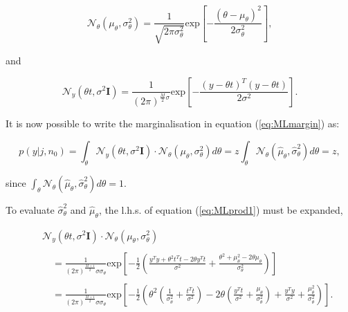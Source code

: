 \begin{equation}\label{eq:MLtheta2}
\mathcal{N}_\theta(\mu_\theta,\sigma^2_\theta) = \frac{1}{\sqrt{2 \pi \sigma_\theta^2}} \textrm{exp}\left[-\frac{\left(\theta - \mu_\theta\right)^2}{2\sigma_\theta^2}\right],
\end{equation}

and

\begin{equation}\label{eq:MLnoise2}
\mathcal{N}_y(\theta t,\sigma^2 \textbf{I}) = \frac{1}{\left(2 \pi\right)^{\frac{M}{2}\sigma}} \textrm{exp}\left[-\frac{\left(y - \theta t\right)^T\left(y - \theta t\right)}{2\sigma^2}\right].
\end{equation}

It is now possible to write the marginalisation in equation (\ref{eq:MLmargin}) as:

\begin{equation}\label{eq:MLmargin2}
p(y|j,n_0)=\int_\theta \mathcal{N}_y(\theta t,\sigma^2 \textbf{I})\cdot\mathcal{N}_\theta(\mu_\theta,\sigma^2_\theta) d\theta = z \int_\theta \mathcal{N}_\theta(\hat{\mu}_\theta,\hat{\sigma}^2_\theta) d\theta = z,
\end{equation}

since $\int_\theta \mathcal{N}_\theta(\hat{\mu}_\theta,\hat{\sigma}^2_\theta) d\theta = 1$.

To evaluate $\hat{\sigma}^2_\theta$ and $\hat{\mu}_\theta$, the l.h.s. of equation (\ref{eq:MLprod1}) must be expanded,

\begin{eqnarray}\label{eq:MLprod3}
& & \mathcal{N}_y(\theta t,\sigma^2 \textbf{I})\cdot\mathcal{N}_\theta(\mu_\theta,\sigma^2_\theta) \\\nonumber{}\\\nonumber
& & \quad = \frac{1}{\left(2\pi\right)^{\frac{M+1}{2}} \sigma \sigma_\theta} \textrm{exp}\left[-\frac{1}{2}\left(\frac{y^Ty +\theta^2t^Tt-2\theta y^T t}{\sigma^2}+\frac{\theta^2 + \mu^2_\theta-2\theta\mu_\theta}{\sigma_\theta^2}\right)\right]\\\nonumber{}\\\nonumber
& & \quad = \frac{1}{\left(2\pi\right)^{\frac{M+1}{2}} \sigma \sigma_\theta} \textrm{exp}\left[-\frac{1}{2}\left(\theta^2 \left(\frac{1}{\sigma_\theta^2}+\frac{t^T t}{\sigma^2}\right) - 2\theta\left(\frac{y^T t}{\sigma^2}+\frac{\mu_\theta}{\sigma_\theta^2}\right) + \frac{y^Ty}{\sigma^2} +\frac{\mu_\theta^2}{\sigma_\theta^2}\right)\right].
\end{eqnarray}

